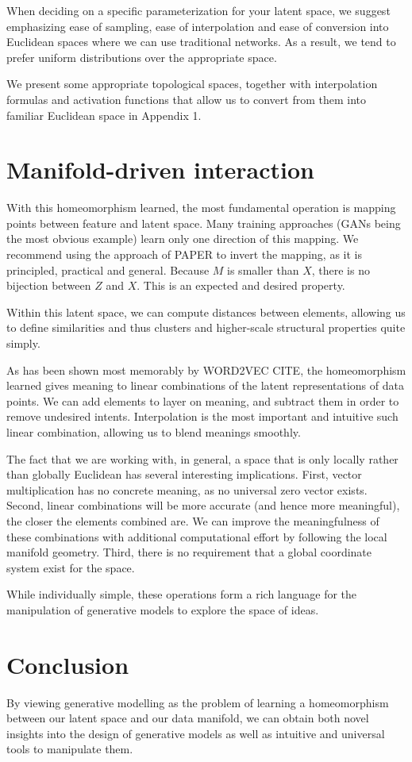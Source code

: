 \documentclass{article}
\begin{document}
When deciding on a specific parameterization for your latent space, we suggest emphasizing ease of sampling, ease of interpolation and ease of conversion into Euclidean spaces where we can use traditional networks.
As a result, we tend to prefer uniform distributions over the appropriate space.

We present some appropriate topological spaces, together with interpolation formulas and activation functions that allow us to convert from them into familiar Euclidean space in Appendix 1.

\section{Manifold-driven interaction}

With this homeomorphism learned, the most fundamental operation is mapping points between feature and latent space.
Many training approaches (GANs being the most obvious example) learn only one direction of this mapping.
We recommend using the approach of PAPER to invert the mapping, as it is principled, practical and general.
Because $M$ is smaller than $X$, there is no bijection between $Z$ and $X$.
This is an expected and desired property.

Within this latent space, we can compute distances between elements, allowing us to define similarities and thus clusters and higher-scale structural properties quite simply.

As has been shown most memorably by WORD2VEC CITE, the homeomorphism learned gives meaning to linear combinations of the latent representations of data points.
We can add elements to layer on meaning, and subtract them in order to remove undesired intents.
Interpolation is the most important and intuitive such linear combination, allowing us to blend meanings smoothly.

The fact that we are working with, in general, a space that is only locally rather than globally Euclidean has several interesting implications.
First, vector multiplication has no concrete meaning, as no universal zero vector exists.
Second, linear combinations will be more accurate (and hence more meaningful), the closer the elements combined are.
We can improve the meaningfulness of these combinations with additional computational effort by following the local manifold geometry.
Third, there is no requirement that a global coordinate system exist for the space.

While individually simple, these operations form a rich language for the manipulation of generative models to explore the space of ideas. 

\section{Conclusion}
By viewing generative modelling as the problem of learning a homeomorphism between our latent space and our data manifold, we can obtain both novel insights into the design of generative models as well as intuitive and universal tools to manipulate them.

\end{document}
